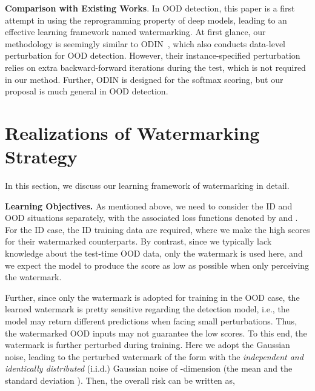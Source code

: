 \documentclass{article}
\begin{document}
\textbf{Comparison with Existing Works}. In OOD detection, this paper is a first attempt in using the reprogramming property of deep models, leading to an effective learning framework named watermarking. At first glance, our methodology is seemingly similar to ODIN~\cite{LiangLS18}, which also conducts data-level perturbation for OOD detection. However, their instance-specified perturbation relies on extra backward-forward iterations during the test, which is not required in our method. Further, ODIN is designed for the softmax scoring, but our proposal is much general in OOD detection. 








































\section{Realizations of Watermarking Strategy} 

\label{sec: realization}

In this section, we discuss our learning framework of watermarking in detail. 

\textbf{Learning Objectives.}
As mentioned above, we need to consider the ID and OOD situations separately, with the associated loss functions denoted by  and . For the ID case, the ID training data are required, where we make the high scores for their watermarked counterparts. By contrast, since we typically lack knowledge about the test-time OOD data, only the watermark is used here, and we expect the model to produce the score as low as possible when only perceiving the watermark. 


Further, since only the watermark is adopted for training in the OOD case, the learned watermark is pretty sensitive regarding the detection model, i.e., the model may return different predictions when facing small perturbations. Thus, 
the watermarked OOD inputs may not guarantee the low scores. To this end, the watermark is further perturbed during training. Here we adopt the Gaussian noise, leading to the perturbed watermark of the form  with   the \emph{independent and identically distributed} (i.i.d.) Gaussian noise of -dimension (the mean  and the standard deviation ). Then, the overall risk can be written as,
\end{document}
